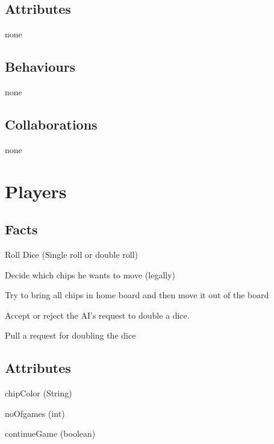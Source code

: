 \documentclass{report}
\begin{document}
\subsection{Attributes}

\begin{dashed}
    \item none
\end{dashed}

\subsection{Behaviours}

\begin{dashed}
    \item none
\end{dashed}

\subsection{Collaborations}

\begin{dashed}
    \item none
\end{dashed}

\section{Players}

\subsection{Facts}

\begin{dashed}
    \item Roll Dice (Single roll or double roll)
    \item Decide which chips he wants to move (legally)
    \item Try to bring all chips in home board and then move it out of the board
    \item Accept or reject the AI's request to double a dice.
    \item Pull a request for doubling the dice
\end{dashed}

\subsection{Attributes}

    \begin{dashed}
        \item chipColor (String)
        \item noOfgames (int)
        \item continueGame (boolean)
    \end{dashed}
\end{document}
